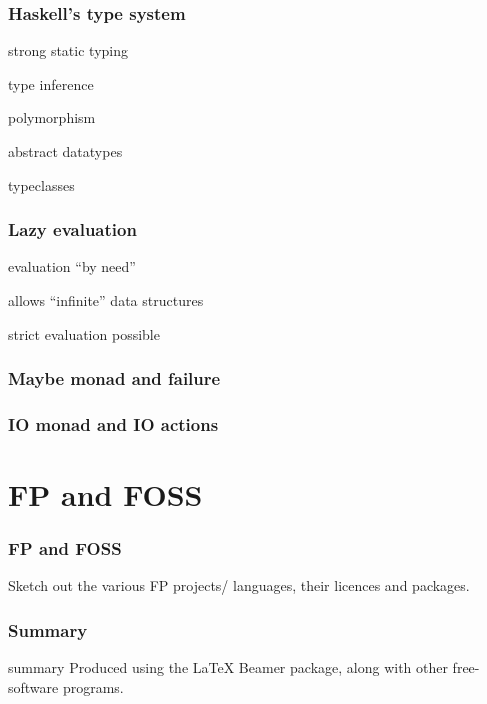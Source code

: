 \begin{frame}
\frametitle{Haskell's type system}
\bi
\item strong static typing
\item type inference
\item polymorphism
\item abstract datatypes
\item typeclasses
\ei
\end{frame}

\begin{frame}
\frametitle{Lazy evaluation}
\bi
\item evaluation ``by need''
\item allows ``infinite'' data structures
\item strict evaluation possible
\ei
\end{frame}

\begin{frame}
\frametitle{Maybe monad and failure}

\end{frame}

\begin{frame}
\frametitle{IO monad and IO actions}

\end{frame}

\section{FP and FOSS}

\begin{frame}
\frametitle{FP and FOSS}
Sketch out the various FP projects{\slash} languages, their
licences and packages.
\end{frame}

\begin{frame}
\frametitle{Summary}
\bi
\item summary
\ei
\medskip
{\scriptsize Produced using the {\LaTeX} Beamer package, along
  with other free-software programs.}
\end{frame}


